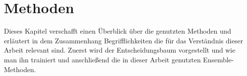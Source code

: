 \chapter{Methoden}
Dieses Kapitel verschafft einen Überblick über die genutzten Methoden und erläutert in dem Zusammenhang Begrifflichkeiten die für das Verständnis dieser Arbeit relevant sind. Zuerst wird der Entscheidungsbaum vorgestellt
und wie man ihn trainiert und anschließend die in dieser Arbeit genutzten Ensemble-Methoden.

